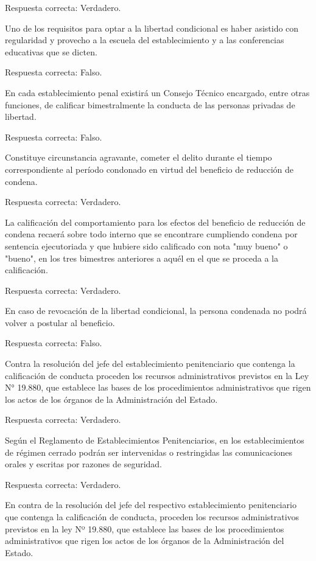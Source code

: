 \documentclass[letterpaper, 11pt]{article}
\begin{document}
Respuesta correcta: Verdadero.

Uno de los requisitos para optar a la libertad condicional es haber asistido con
regularidad y provecho a la escuela del establecimiento y a las conferencias educativas que
se dicten.

Respuesta correcta: Falso.

En cada establecimiento penal existirá un Consejo Técnico encargado, entre otras
funciones, de calificar bimestralmente la conducta de las personas privadas de libertad.

Respuesta correcta: Falso.

Constituye circunstancia agravante, cometer el delito durante el tiempo correspondiente
al período condonado en virtud del beneficio de reducción de condena.

Respuesta correcta: Verdadero.

La calificación del comportamiento para los efectos del beneficio de reducción de
condena recaerá sobre todo interno que se encontrare cumpliendo condena por sentencia
ejecutoriada y que hubiere sido calificado con nota "muy bueno" o "bueno", en los tres
bimestres anteriores a aquél en el que se proceda a la calificación.

Respuesta correcta: Verdadero.

En caso de revocación de la libertad condicional, la persona condenada no podrá volver
a postular al beneficio.

Respuesta correcta: Falso.

Contra la resolución del jefe del establecimiento penitenciario que contenga la
calificación de conducta proceden los recursos administrativos previstos en la Ley N°
19.880, que establece las bases de los procedimientos administrativos que rigen los actos
de los órganos de la Administración del Estado.

Respuesta correcta: Verdadero.

Según el Reglamento de Establecimientos Penitenciarios, en los establecimientos de
régimen cerrado podrán ser intervenidas o restringidas las comunicaciones orales y escritas
por razones de seguridad.

Respuesta correcta: Verdadero.

En contra de la resolución del jefe del respectivo establecimiento penitenciario que
contenga la calificación de conducta, proceden los recursos administrativos previstos en la
ley Nº 19.880, que establece las bases de los procedimientos administrativos que rigen los
actos de los órganos de la Administración del Estado.
\end{document}
